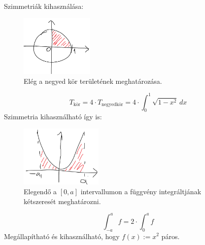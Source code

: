 \documentclass[a4paper,11.5pt]{article}
\begin{document}
		Szimmetriák kihasználása:
		\begin{figure}[H]
			\centering
			\includegraphics[height=3cm]{kepek/06.png}
			\caption{Elég a negyed kör területének meghatározása.}
		\end{figure}
		\[ T_{\text{kör}}=4\cdot T_{\text{negyedkör}}=4\cdot\int_0^1\sqrt{1-x^2}\,dx \]
		Szimmetria kihasználható így is:
		\begin{figure}[H]
			\centering
			\includegraphics[height=3cm]{kepek/07.png}
			\caption{Elegendő a $[0,a]$ intervallumon a függvény integráltjának kétszeresét meghatározni.}
		\end{figure}
		\[ \int_{-a}^{a}f=2\cdot\int_0^af \]
		Megállapítható és kihasználható, hogy $f(x):=x^2$ páros.
		
\end{document}

